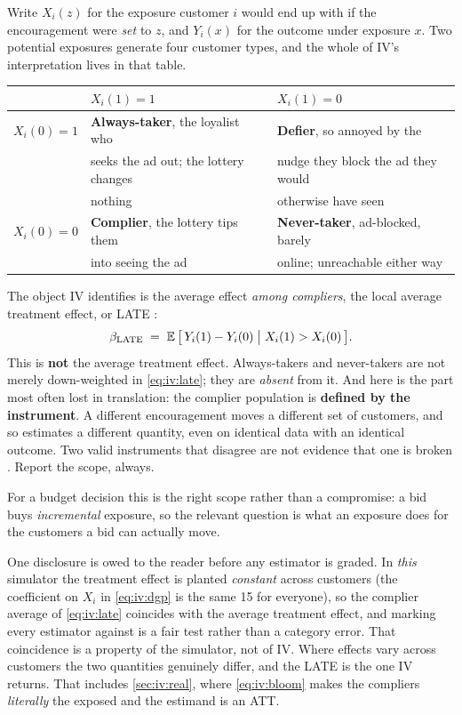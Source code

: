 Write $X_i(z)$ for the exposure customer $i$ would end up with if the encouragement were
\emph{set} to $z$, and $Y_i(x)$ for the outcome under exposure $x$. Two potential exposures
generate four customer types, and the whole of IV's interpretation lives in that table.

\begin{center}\small
\begin{tabular}{@{}lll@{}}
\toprule
 & $X_i(1) = 1$ & $X_i(1) = 0$ \\
\midrule
$X_i(0) = 1$ & \textbf{Always-taker}, the loyalist who & \textbf{Defier}, so annoyed by the \\
             & seeks the ad out; the lottery changes & nudge they block the ad they would \\
             & nothing & otherwise have seen \\[3pt]
$X_i(0) = 0$ & \textbf{Complier}, the lottery tips them & \textbf{Never-taker}, ad-blocked,
                                                             barely \\
             & into seeing the ad & online; unreachable either way \\
\bottomrule
\end{tabular}
\end{center}

The object IV identifies is the average effect \emph{among compliers}, the local average
treatment effect, or LATE \citep{imbens1994, angrist1996}:
%
\begin{equation}
  \beta_{\text{LATE}} \;=\; \operatorname{\mathbb{E}}\big[\,Y_i(1) - Y_i(0) \;\big|\; X_i(1) > X_i(0)\,\big].
  \label{eq:iv:late}
\end{equation}
%
This is \textbf{not} the average treatment effect. Always-takers and never-takers are not merely
down-weighted in \cref{eq:iv:late}; they are \emph{absent} from it. And here is the part most often
lost in translation: the complier population is \textbf{defined by the instrument}.
A different encouragement moves a different set of customers, and so estimates a different
quantity, even on identical data with an identical outcome. Two valid instruments that
disagree are not evidence that one is broken \citep{imbens2014, deaton2010}. Report the
scope, always.

For a budget decision this is the right scope rather than a compromise: a bid buys
\emph{incremental} exposure, so the relevant question is what an exposure does for the customers a
bid can actually move.

One disclosure is owed to the reader before any estimator is graded. In \emph{this} simulator the
treatment effect is planted \emph{constant} across customers (the coefficient on $X_i$ in
\cref{eq:iv:dgp} is the same 15 for everyone), so the complier average of \cref{eq:iv:late}
coincides with the average treatment effect, and marking every estimator against \eur{\nbElevenTrue}
is a fair test rather than a category error. That coincidence is a property of the simulator, not of
IV. Where effects vary across customers the two quantities genuinely differ, and the LATE is the one
IV returns. That includes \cref{sec:iv:real}, where \cref{eq:iv:bloom} makes the compliers
\emph{literally} the exposed and the estimand is an ATT.

